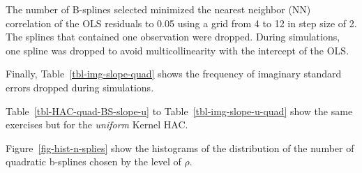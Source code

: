\documentclass[
]{article}
\begin{document}
The number of B-splines selected minimized the nearest neighbor (NN)
correlation of the OLS residuals to 0.05 using a grid from 4 to 12 in
step size of 2. The splines that contained one observation were dropped.
During simulations, one spline was dropped to avoid multicollinearity
with the intercept of the OLS.

Finally, Table~\ref{tbl-img-slope-quad} shows the frequency of imaginary
standard errors dropped during simulations.

Table~\ref{tbl-HAC-quad-BS-slope-u} to Table~\ref{tbl-img-slope-u-quad}
show the same exercises but for the \emph{uniform} Kernel HAC.

Figure~\ref{fig-hist-n-splies} show the histograms of the distribution
of the number of quadratic b-splines chosen by the level of \(\rho\).
\end{document}
